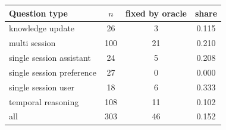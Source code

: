 \begin{tabular}{lccc}
\toprule
Question type & $n$ & fixed by oracle & share \\
\midrule
knowledge update & 26 & 3 & 0.115 \\
multi session & 100 & 21 & 0.210 \\
single session assistant & 24 & 5 & 0.208 \\
single session preference & 27 & 0 & 0.000 \\
single session user & 18 & 6 & 0.333 \\
temporal reasoning & 108 & 11 & 0.102 \\
\midrule
all & 303 & 46 & 0.152 \\
\bottomrule
\end{tabular}